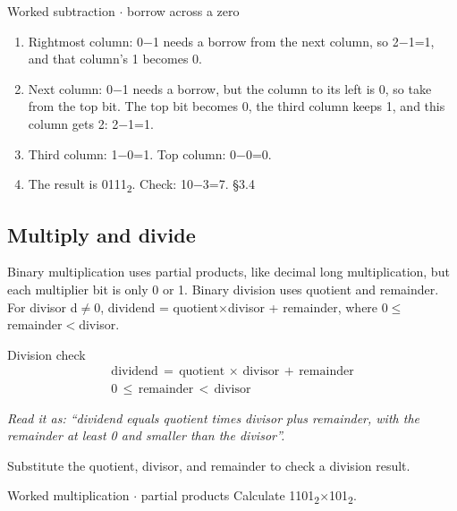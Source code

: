 \documentclass[11pt]{article}
\begin{document}
\begin{keepsection}
\begin{keepsection}
\begin{workedbox}{Worked subtraction \ensuremath{\cdot} borrow across a zero}
\begin{enumerate}
\item Rightmost column: 0\ensuremath{-}1 needs a borrow from the next column, so 2\ensuremath{-}1=1, and that column’s 1 becomes 0.
\item Next column: 0\ensuremath{-}1 needs a borrow, but the column to its left is 0, so take from the top bit. The top bit becomes 0, the third column keeps 1, and this column gets 2: 2\ensuremath{-}1=1.
\item Third column: 1\ensuremath{-}0=1. Top column: 0\ensuremath{-}0=0.
\item The result is 0111\textsubscript{2}. Check: 10\ensuremath{-}3=7. \hfill{\small\color{FAUblue}§3.4}
\end{enumerate}
\end{workedbox}
\end{keepsection}

\begin{keepsection}
\subsection{Multiply and divide}

Binary multiplication uses partial products, like decimal long multiplication, but each multiplier bit is only 0 or 1. Binary division uses quotient and remainder. For divisor d\ensuremath{\neq}0, dividend = quotient\ensuremath{\times}divisor + remainder, where 0\ensuremath{\leq}remainder\ensuremath{<}divisor.

\begin{equationcard}{Division check}
\[ \begin{gathered} \text{dividend}\, =\, \text{quotient}\, \times \, \text{divisor}\, +\, \text{remainder} \\ 0\, \leq \, \text{remainder}\, <\, \text{divisor} \end{gathered} \]
{\small \emph{Read it as: “dividend equals quotient times divisor plus remainder, with the remainder at least 0 and smaller than the divisor”.}\par Substitute the quotient, divisor, and remainder to check a division result.}
\end{equationcard}

\begin{workedbox}{Worked multiplication \ensuremath{\cdot} partial products}
Calculate 1101\textsubscript{2}\ensuremath{\times}101\textsubscript{2}.


\end{workedbox}
\end{keepsection}
\end{keepsection}
\end{document}
